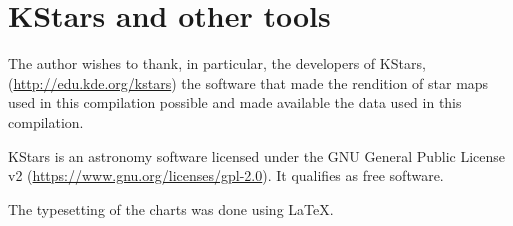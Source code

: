 \section*{KStars and other tools}

The author wishes to thank, in particular, the developers of KStars,
(\url{http://edu.kde.org/kstars}) the software that made the rendition
of star maps used in this compilation possible and made available the
data used in this compilation.

KStars is an astronomy software licensed under the GNU General Public
License v2 (\url{https://www.gnu.org/licenses/gpl-2.0}). It qualifies
as free software.

The typesetting of the charts was done using \LaTeX.

